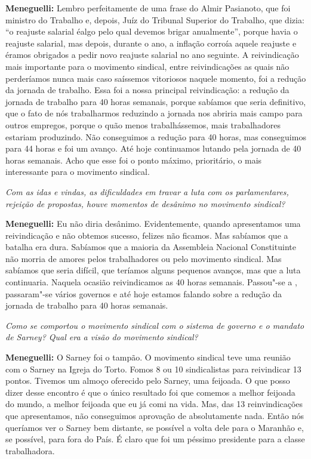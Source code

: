 \textbf{Meneguelli:} Lembro perfeitamente de uma frase do Almir
Pasianoto, que foi ministro do Trabalho e, depois, Juíz do Tribunal
Superior do Trabalho, que dizia: ``o reajuste salarial éalgo pelo qual
devemos brigar anualmente'', porque havia o reajuste salarial, mas
depois, durante o ano, a inflação corroía aquele reajuste e éramos
obrigados a pedir novo reajuste salarial no ano seguinte. A
reivindicação mais importante para o movimento sindical, entre
reivindicações as quais não perderíamos nunca mais caso saíssemos
vitoriosos naquele momento, foi a redução da jornada de trabalho. Essa
foi a nossa principal reivindicação: a redução da jornada de trabalho
para 40 horas semanais, porque sabíamos que seria definitivo, que o fato
de nós trabalharmos reduzindo a jornada nos abriria mais campo para
outros empregos, porque o quão menos trabalhássemos, mais trabalhadores
estariam produzindo. Não conseguimos a redução para 40 horas, mas
conseguimos para 44 horas e foi um avanço. Até hoje continuamos lutando
pela jornada de 40 horas semanais. Acho que esse foi o ponto máximo,
prioritário, o mais interessante para o movimento sindical.

\emph{Com as idas e vindas, as dificuldades em travar a luta com os
parlamentares, rejeição de propostas, houve momentos de desânimo no
movimento sindical?}

\textbf{Meneguelli:} Eu não diria desânimo. Evidentemente, quando
apresentamos uma reivindicação e não obtemos sucesso, felizes não
ficamos. Mas sabíamos que a batalha era dura. Sabíamos que a maioria da
Assembleia Nacional Constituinte não morria de amores pelos
trabalhadores ou pelo movimento sindical. Mas sabíamos que seria
difícil, que teríamos alguns pequenos avanços, mas que a luta
continuaria. Naquela ocasião reivindicamos as 40 horas semanais.
Passou"-se a , passaram"-se vários governos e até hoje estamos falando
sobre a redução da jornada de trabalho para 40 horas semanais.

\emph{Como se comportou o movimento sindical com o sistema de governo
e o mandato de Sarney? Qual era a visão do movimento sindical?}

\textbf{Meneguelli:} O Sarney foi o tampão. O movimento sindical teve
uma reunião com o Sarney na Igreja do Torto. Fomos 8 ou 10 sindicalistas
para reivindicar 13 pontos. Tivemos um almoço oferecido pelo Sarney, uma
feijoada. O que posso dizer desse encontro é que o único resultado foi
que comemos a melhor feijoada do mundo, a melhor feijoada que eu já comi
na vida. Mas, das 13 reinvindicações que apresentamos, não conseguimos
aprovação de absolutamente nada. Então nós queríamos ver o Sarney bem
distante, se possível a volta dele para o Maranhão e, se possível, para
fora do País. É claro que foi um péssimo presidente para a classe
trabalhadora.

